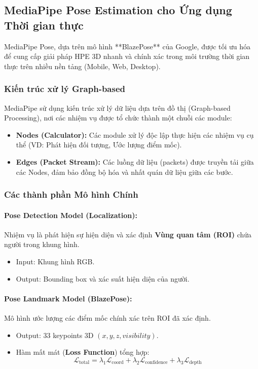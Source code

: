 \subsection{MediaPipe Pose Estimation cho Ứng dụng Thời gian thực}

MediaPipe Pose, dựa trên mô hình **BlazePose** của Google, được tối ưu hóa để cung cấp giải pháp HPE 3D nhanh và chính xác trong môi trường thời gian thực trên nhiều nền tảng (Mobile, Web, Desktop).

\subsubsection{Kiến trúc xử lý Graph-based}

MediaPipe sử dụng kiến trúc xử lý dữ liệu dựa trên đồ thị (Graph-based Processing), nơi các nhiệm vụ được tổ chức thành một chuỗi các module:
\begin{itemize}
    \item \textbf{Nodes (Calculator):} Các module xử lý độc lập thực hiện các nhiệm vụ cụ thể (VD: Phát hiện đối tượng, Ước lượng điểm mốc).
    \item \textbf{Edges (Packet Stream):} Các luồng dữ liệu (packets) được truyền tải giữa các Nodes, đảm bảo đồng bộ hóa và nhất quán dữ liệu giữa các bước.
\end{itemize}

\subsubsection{Các thành phần Mô hình Chính}

\paragraph{Pose Detection Model (Localization):} Nhiệm vụ là phát hiện sự hiện diện và xác định \textbf{Vùng quan tâm (ROI)} chứa người trong khung hình.
\begin{itemize}
    \item Input: Khung hình RGB.
    \item Output: Bounding box và xác suất hiện diện của người.
\end{itemize}

\paragraph{Pose Landmark Model (BlazePose):} Mô hình ước lượng các điểm mốc chính xác trên ROI đã xác định.
\begin{itemize}
    \item Output: 33 keypoints 3D $(x, y, z, visibility)$.
    \item Hàm mất mát (\textbf{Loss Function}) tổng hợp:
    \begin{equation}
    \mathcal{L}_{\text{total}} = \lambda_1 \mathcal{L}_{\text{coord}} + \lambda_2 \mathcal{L}_{\text{confidence}} + \lambda_3 \mathcal{L}_{\text{depth}}
    \end{equation}
\end{itemize}

